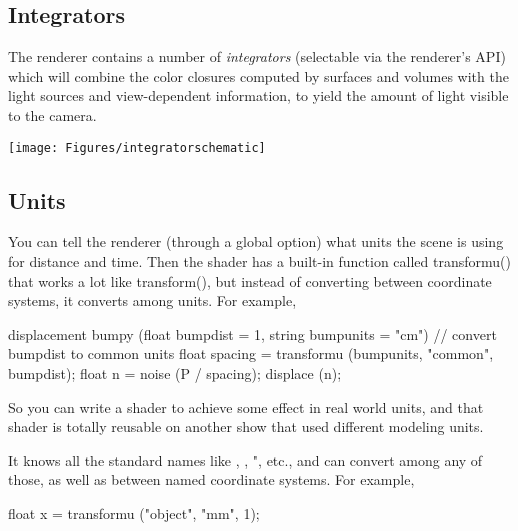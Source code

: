 \documentclass[11pt,letterpaper]{book}
\def\langname{Open Shading Language\xspace}
\begin{document}
\subsection*{Integrators}

The renderer contains a number of \emph{integrators} (selectable via the
renderer's API) which will combine the color closures computed by
surfaces and volumes with the light sources and view-dependent
information, to yield the amount of light visible to the camera.

\bigskip

\texttt{[image: Figures/integratorschematic]}

\medskip


\subsection*{Units}

You can tell the renderer (through a global option) what units the scene
is using for distance and time.  Then the shader has a built-in function
called {\cf transformu()} that works a lot like {\cf transform()}, but
instead of converting between coordinate systems, it converts among
units.  For example,

\begin{code}
    displacement bumpy (float bumpdist = 1,
                        string bumpunits = "cm")
    {
        // convert bumpdist to common units
        float spacing = transformu (bumpunits, "common", bumpdist);
        float n = noise (P / spacing);
        displace (n);
    }
\end{code}

So you can write a shader to achieve some effect in real world units,
and that shader is totally reusable on another show that used different
modeling units.

It knows all the standard names like , , ",
etc., and can convert among any of those, as well as between named
coordinate systems.  For example,

\begin{code}
    float x = transformu ("object", "mm", 1);
\end{code}
\end{document}
